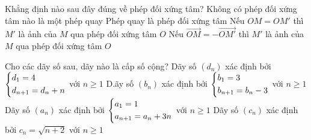 \begin{ex}%
	Khẳng định nào sau đây đúng về phép đối xứng tâm?
	\choice
	{Không có phép đối xứng tâm nào là một phép quay}
	{Phép quay là phép đối xứng tâm}
	{Nếu $OM=O{M}'$ thì ${M}'$ là ảnh của $M$ qua phép đối xứng tâm $O$}
	{\True Nếu $\overrightarrow{OM}=-\overrightarrow{O{M}'}$ thì ${M}'$ là ảnh của $M$ qua phép đối xứng tâm $O$}
\end{ex}
\begin{ex}%
	Cho các dãy số sau, dãy nào là cấp số cộng?
	\choice
	{Dãy số $\left(d_n\right)$ xác định bởi $\left\{\begin{aligned}
			& d_1=4 \\ 
			& {d}_{n+1}=d_n+n \\ \end{aligned}\right.$ với $n\ge 1$}
	{\True D.ãy số $\left(b_n\right)$ xác định bởi $\left\{\begin{aligned}
			& b_1=3 \\ 
			& {b}_{n+1}=b_n-3 \\ \end{aligned}\right.$ với $n\ge 1$}
	{Dãy số $\left(a_n\right)$ xác định bởi $\left\{\begin{aligned}
			& a_1=1 \\ 
			& {a}_{n+1}=a_n+3n \\ \end{aligned}\right.$ với $n\ge 1$}
	{Dãy số $\left(c_n\right)$ xác định bởi $c_n=\sqrt{n+2}$ với $n\ge 1$}
	\end{ex}
